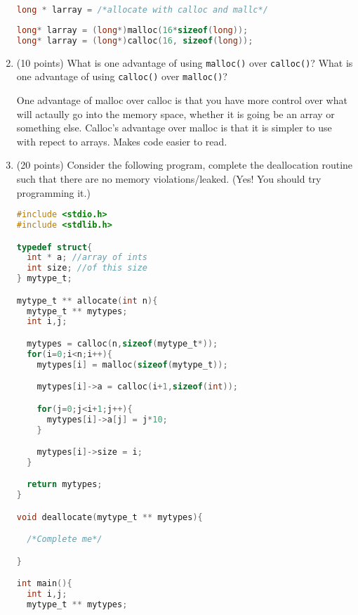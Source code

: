 \documentclass{article}[9pt]
\newenvironment{answerfont}{\fontfamily{qhv}\selectfont}{\par}
\newenvironment{myanswer}{\begin{mdframed}\begin{answerfont}}{\end{answerfont}\end{mdframed}}
\begin{document}
\begin{enumerate}
\begin{lstlisting}[language=c]
long * larray = /*allocate with calloc and mallc*/
\end{lstlisting}

\begin{myanswer}
\begin{lstlisting}[language=c]
long* larray = (long*)malloc(16*sizeof(long));
long* larray = (long*)calloc(16, sizeof(long));
\end{lstlisting}
\end{myanswer}

\item (10 points) What is one advantage of using \texttt{malloc()} over \texttt{calloc()}? What
is one advantage of using \texttt{calloc()} over \texttt{malloc()}?

\begin{myanswer}
One advantage of malloc over calloc is that you have more control over what will actaully go into the memory space,
whether it is going be an array or something else. Calloc's advantage over malloc is that it is simpler to use with
repect to arrays. Makes code easier to read.
\end{myanswer}

\item (20 points) Consider the following program, complete the deallocation routine
such that there are no memory violations/leaked. (Yes! You should
try programming it.)

\begin{lstlisting}[language=c]
#include <stdio.h>
#include <stdlib.h>

typedef struct{
  int * a; //array of ints
  int size; //of this size
} mytype_t;

mytype_t ** allocate(int n){
  mytype_t ** mytypes;
  int i,j;

  mytypes = calloc(n,sizeof(mytype_t*));
  for(i=0;i<n;i++){
    mytypes[i] = malloc(sizeof(mytype_t));

    mytypes[i]->a = calloc(i+1,sizeof(int));

    for(j=0;j<i+1;j++){
      mytypes[i]->a[j] = j*10;
    }

    mytypes[i]->size = i;
  }

  return mytypes;
}

void deallocate(mytype_t ** mytypes){

  /*Complete me*/

}

int main(){
  int i,j;
  mytype_t ** mytypes;


\end{lstlisting}
\end{enumerate}
\end{document}
